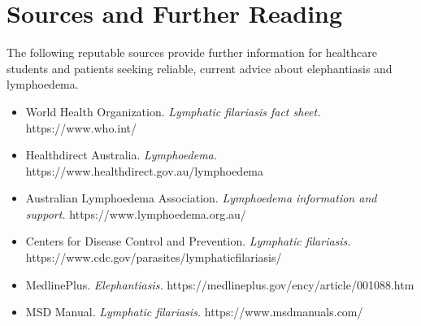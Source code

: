 \section*{Sources and Further Reading}
The following reputable sources provide further information for healthcare students and patients seeking reliable, current advice about elephantiasis and lymphoedema.
\begin{itemize}
    \item World Health Organization. \textit{Lymphatic filariasis fact sheet.} https://www.who.int/
    \item Healthdirect Australia. \textit{Lymphoedema.} https://www.healthdirect.gov.au/lymphoedema
    \item Australian Lymphoedema Association. \textit{Lymphoedema information and support.} https://www.lymphoedema.org.au/
    \item Centers for Disease Control and Prevention. \textit{Lymphatic filariasis.} https://www.cdc.gov/parasites/lymphaticfilariasis/
    \item MedlinePlus. \textit{Elephantiasis.} https://medlineplus.gov/ency/article/001088.htm
    \item MSD Manual. \textit{Lymphatic filariasis.} https://www.msdmanuals.com/
\end{itemize}
